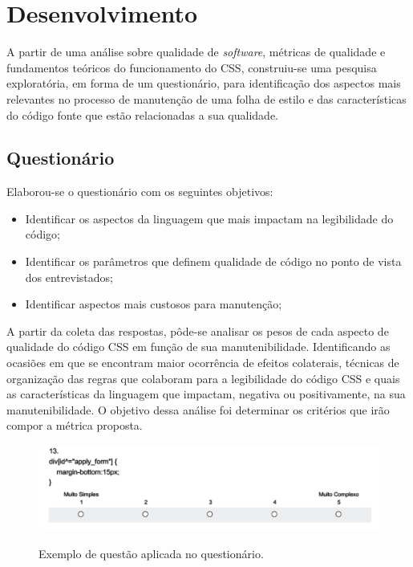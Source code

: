 \chapter{Desenvolvimento}

A partir de uma análise sobre qualidade de \textit{software}, métricas de qualidade e fundamentos teóricos do funcionamento do CSS, construiu-se uma pesquisa exploratória, em forma de um questionário, para identificação dos aspectos mais relevantes no processo de manutenção de uma folha de estilo e das características do código fonte que estão relacionadas a sua qualidade.

\section{Questionário}
Elaborou-se o questionário com os seguintes objetivos:

\begin{itemize}
	\item Identificar os aspectos da linguagem que mais impactam na legibilidade do código;
	\item Identificar os parâmetros que definem qualidade de código no ponto de vista dos entrevistados;
	\item Identificar aspectos mais custosos para manutenção;	
\end{itemize}

A partir da coleta das respostas, pôde-se analisar os pesos de cada aspecto de qualidade do código CSS em função de sua manutenibilidade. Identificando as ocasiões em que se encontram maior ocorrência de efeitos colaterais, técnicas de organização das regras que colaboram para a legibilidade do código CSS e quais as características da linguagem que impactam, negativa ou positivamente, na sua manutenibilidade. O objetivo dessa análise foi determinar os critérios que irão compor a métrica proposta.

\begin{figure}[!htb]
	\centering
	\caption{Exemplo de questão aplicada no questionário.}
	\includegraphics[width=1\textwidth]{./04-figuras/questionario_q13}
	\label{fig:questionario_q13}
\end{figure}

